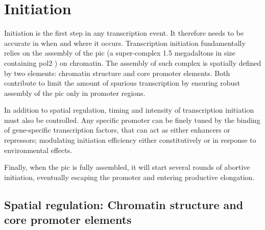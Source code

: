 \section{Initiation}



Initiation is the first step in any transcription event. 
It therefore needs to be accurate in when and where it occurs. 
Transcription initiation fundamentally relies on the assembly of the \gls{pic} (a super-complex 1.5 megadaltons in size  containing \gls{pol2} \cite{fazal:2015:realtime}) on chromatin.
The assembly of such complex is spatially defined by two elements: chromatin structure and core promoter elements.
Both contribute to limit the amount of spurious transcription by ensuring robust assembly of the \gls{pic} only in promoter regions.

In addition to spatial regulation, timing and intensity of transcription initiation must also be controlled.
Any specific promoter can be finely tuned by the binding of gene-specific transcription factors, that can act as either enhancers or repressors; modulating initiation efficiency either constitutively or in response to environmental effects. 

Finally, when the \gls{pic} is fully assembled, it will start several rounds of abortive initiation, eventually escaping the promoter and entering productive elongation.

\subsection{Spatial regulation: Chromatin structure and core promoter elements}

